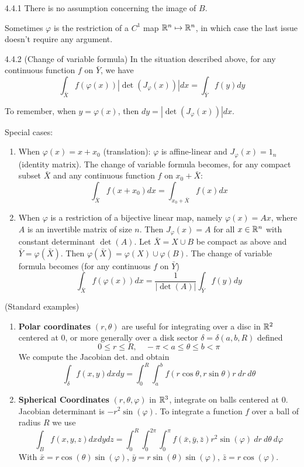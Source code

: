\begin{remark}{4.4.1}
    There is no assumption concerning the image of $B$.

    Sometimes $\varphi$ is the restriction of a $C^1$ map $\mathbb{R}^n \mapsto \mathbb{R}^n$, in which case the last issue doesn't require any argument.
\end{remark}

\begin{theorem}{4.4.2 (Change of variable formula)}
    \label{thm:4.4.2}
    In the situation described above, for any continuous function $f$ on $\bar{Y}$, we have
    \[ \int_{\bar{X}} f(\varphi(x))|\det(J_\varphi(x))|dx = \int_{\bar Y} f(y)dy \]
\end{theorem}

To remember, when $y = \varphi(x)$, then $dy = |\det(J_\varphi(x))|dx$.

Special cases:
\begin{enumerate}
    \item When $\varphi(x) = x + x_0$ (translation): $\varphi$ is affine-linear and $J_\varphi(x) = 1_n$ (identity matrix). The
          change of variable formula becomes, for any compact subset $\bar X$ and any continuous function $f$ on $x_0 + \bar X$:
          \[ \int_{\bar X} f(x + x_0)dx = \int_{x_0 + \bar X} f(x) dx \]

    \item When $\varphi$ is a restriction of a bijective linear map, namely $\varphi(x) = Ax$, where $A$ is an invertible matrix of size $n$.
          Then $J_\varphi(x) = A$ for all $x \in \mathbb{R}^n$ with constant determinant $\det(A)$.
          Let $\bar X = X \cup B$ be compact as above and $\bar Y = \varphi(\bar X)$. Then $\varphi(\bar X) = \varphi(X) \cup \varphi(B)$.
          The change of variable formula becomes (for any continuous $f$ on $\bar Y$)
          \[ \int_{\bar X} f(\varphi(x))dx = \frac{1}{|\det(A)|} \int_{\bar Y} f(y)dy \]
\end{enumerate}

\begin{example}{(Standard examples)}
    \begin{enumerate}
        \item \textbf{Polar coordinates} $(r, \theta)$ are useful for integrating over a disc in $\mathbb{R}^2$ centered
              at $0$, or more generally over a disk sector $\delta = \delta(a,b,R)$ defined
              \[ 0 \le r \le R, \quad -\pi < a \le \theta \le b < \pi\]
              We compute the Jacobian det. and obtain
              \[ \int_\delta f(x,y) dx dy = \int_0^R \int_a^b f(r \cos \theta, r \sin \theta)r\ dr\ d\theta \]
        \item \textbf{Spherical Coordinates} $(r, \theta, \varphi)$ in $\mathbb{R}^3$, integrate on balls centered at $0$.
              Jacobian determinant is $-r^2 \sin(\varphi)$. To integrate a function $f$ over a ball of radius $R$ we use
              \[ \int_B f(x,y,z) dx dy dz = \int_0^R \int_0^{2\pi} \int_0^\pi f(\bar x, \bar y, \bar z) r^2 \sin(\varphi)\ dr\ d\theta\ d\varphi \]
              With $\bar x = r \cos(\theta) \sin(\varphi)$, $\bar y = r \sin(\theta) \sin(\varphi)$, $\bar z = r \cos(\varphi)$.
    \end{enumerate}
\end{example}

